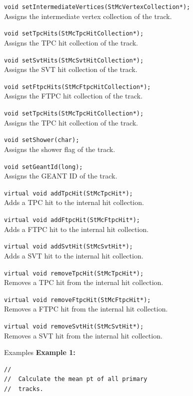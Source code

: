 \begin{Entry}
    \verb+void setIntermediateVertices(StMcVertexCollection*);+\\
    Assigns the intermediate vertex collection of the track.

    \verb+void setTpcHits(StMcTpcHitCollection*);+\\
    Assigns the TPC hit collection of the track.

    \verb+void setSvtHits(StMcSvtHitCollection*);+\\
    Assigns the SVT hit collection of the track.

    \verb+void setFtpcHits(StMcFtpcHitCollection*);+\\
    Assigns the FTPC hit collection of the track.

    \verb+void setTpcHits(StMcTpcHitCollection*);+\\
    Assigns the TPC hit collection of the track.

    \verb+void setShower(char);+\\
    Assigns the shower flag of the track.

    \verb+void setGeantId(long);+\\
    Assigns the GEANT ID of the track.

    \verb+virtual void addTpcHit(StMcTpcHit*);+\\
    Adds a TPC hit to the internal hit collection.
    
    \verb+virtual void addFtpcHit(StMcFtpcHit*);+\\
    Adds a FTPC hit to the internal hit collection.

    \verb+virtual void addSvtHit(StMcSvtHit*);+\\
    Adds a SVT hit to the internal hit collection.

    \verb+virtual void removeTpcHit(StMcTpcHit*);+\\
    Removes a TPC hit from the internal hit collection.

    \verb+virtual void removeFtpcHit(StMcFtpcHit*);+\\
    Removes a FTPC hit from the internal hit collection.

    \verb+virtual void removeSvtHit(StMcSvtHit*);+\\
    Removes a SVT hit from the internal hit collection.

\item[Examples]
{\bf Example 1:}
{\footnotesize
\begin{verbatim}
//
//  Calculate the mean pt of all primary
//  tracks.


\end{verbatim}}
\end{Entry}
